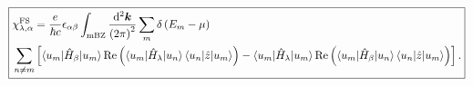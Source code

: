 \documentclass[10pt, oneside]{article}
\begin{document}
\begin{align}
	\begin{split}
		\boxed{
			\begin{aligned}
				& \chi^{\mathrm{FS}}_{\lambda, \alpha} = \frac{e }{\hbar c } \epsilon_{\alpha \beta} \int_{\mathrm{mBZ}} \frac{\mathrm{d}^{2} \bm{k}}{\left(2 \pi\right)^2} \sum_{m} \delta \left(E_{m} - \mu\right) \\
		& \sum_{n \neq m} \left[\braket{u_{m} | \hat{H}_{\beta} | u_{m}} \operatorname{Re} \left(\braket{u_{m} | \hat{H}_{\lambda} | u_{n }} \braket{u_{n} | \hat{z} | u_{m }}\right) - \braket{u_m | \hat{H}_{\lambda} | u_{m} } \operatorname{Re} \left(\braket{u_{m} | \hat{H}_{\beta} | u_n} \braket{u_{n} | \hat{z} | u_{m}}\right) \right].
			\end{aligned}
		}
	\end{split}
\end{align}

\vspace{2em}
\end{document}
